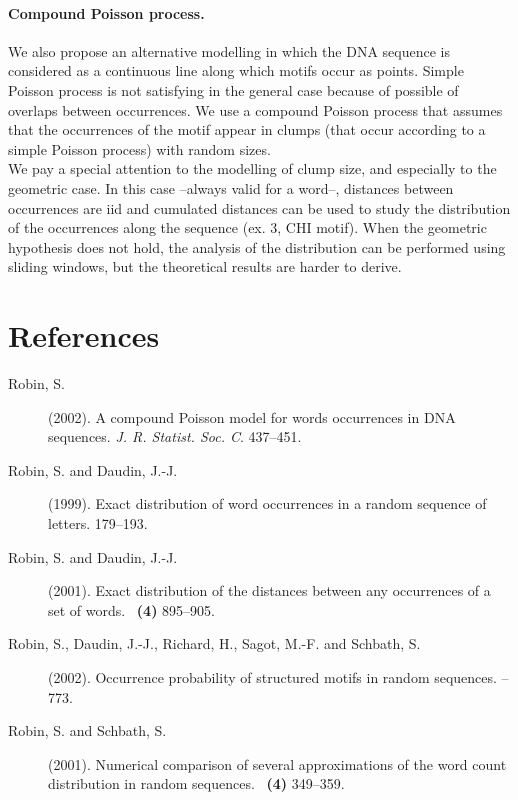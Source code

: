 \documentclass[11pt,a4paper,french]{article}
\begin{document}
\paragraph{Compound Poisson process.}  
We also propose an alternative modelling in which the DNA sequence is
considered as a continuous line along which motifs occur as points.
Simple Poisson process is not satisfying in the general case because
of possible of overlaps between occurrences. We use a compound Poisson
process that assumes that the occurrences of the motif appear in
clumps (that occur according to a simple Poisson process) with random
sizes. \\
We pay a special attention to the modelling of clump size, and
especially to the geometric case. In this case --always valid for a
word--, distances between occurrences are iid and cumulated distances
can be used to study the distribution of the occurrences along the
sequence (ex. 3, CHI motif). When the geometric hypothesis does not
hold, the analysis of the distribution can be performed using sliding
windows, but the theoretical results are harder to derive.


%
%

\section*{References}
\begin{description}
\item[{\sc Robin, S.}]  \newblock (2002).  \newblock A compound
  {P}oisson model for words occurrences in {DNA} sequences.  \newblock
  {\em J. R. Statist. Soc. C}.   437--451.
  
\item[{\sc Robin, S.} \textnormal{and} {\sc Daudin, J.-J.}]  \newblock
  (1999).  \newblock Exact distribution of word occurrences in a
  random sequence of letters.  
   179--193.

\item[{\sc Robin, S.} \textnormal{and} {\sc Daudin, J.-J.}]  \newblock
  (2001).  \newblock Exact distribution of the distances between any
  occurrences of a set of words.    ~{\bf (4)} 895--905.

\item[{\sc Robin, S.}, {\sc Daudin, J.-J.}, {\sc Richard, H.}, {\sc
    Sagot, M.-F.} \textnormal{and} {\sc Schbath, S.}]  \newblock
  (2002).  \newblock Occurrence probability of structured motifs in
  random sequences.    --773.

\item[{\sc Robin, S.} \textnormal{and} {\sc Schbath, S.}]  \newblock
  (2001).  \newblock Numerical comparison of several approximations of
  the word count distribution in random sequences.    ~{\bf (4)} 349--359.

\end{description}

\end{document}
